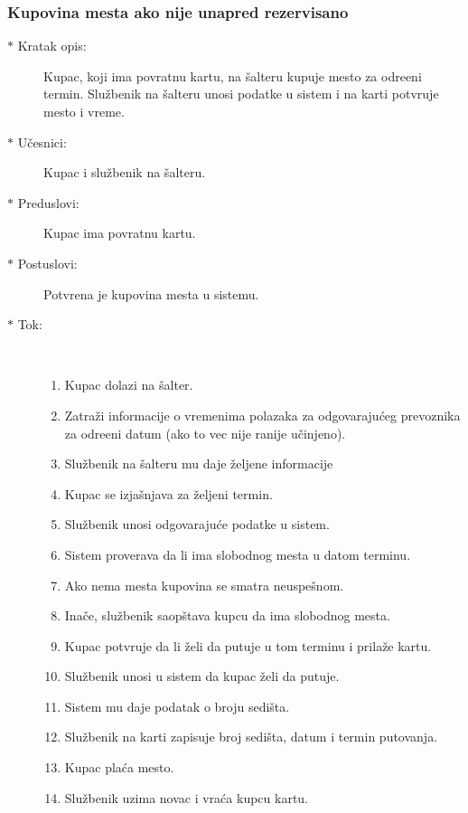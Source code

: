 \subsubsection{Kupovina mesta ako nije unapred rezervisano}
\begin{description}
	\item[$\ast$ Kratak opis: ] Kupac, koji ima povratnu kartu, na \v salteru kupuje mesto za odre\dj{}eni termin. Slu\v zbenik na \v salteru unosi podatke u sistem i na karti potvr\dj{}uje mesto i vreme.
	\item[$\ast$ U\v cesnici: ] Kupac i slu\v zbenik na \v salteru.
	\item[$\ast$ Preduslovi: ] Kupac ima povratnu kartu.
	\item[$\ast$ Postuslovi: ] Potvr\dj{}ena je kupovina mesta u sistemu.
	\item[$\ast$ Tok: ] \ \\
	\begin{enumerate}
		\item Kupac dolazi na \v salter.
		\item Zatra\v zi informacije o vremenima polazaka za odgovaraju\'ceg prevoznika za odre\dj{}eni datum (ako to vec nije ranije u\v cinjeno).
		\item Slu\v zbenik na \v salteru mu daje \v zeljene informacije
		\item Kupac se izja\v snjava za \v zeljeni termin.
		\item Slu\v zbenik unosi odgovaraju\'ce podatke u sistem.
		\item Sistem proverava da li ima slobodnog mesta u datom terminu.
		\item Ako nema mesta kupovina se smatra neuspe\v snom.
		\item Ina\v ce, slu\v zbenik saop\v stava kupcu da ima slobodnog mesta.
		\item Kupac potvr\dj{}uje da li \v zeli da putuje u tom terminu i prila\v ze kartu.
		\item Slu\v zbenik unosi u sistem da kupac \v zeli da putuje.
		\item Sistem mu daje podatak o broju sedi\v sta.
		\item Slu\v zbenik na karti zapisuje broj sedi\v sta, datum i termin putovanja.
		\item Kupac pla\'ca mesto.
		\item Slu\v zbenik uzima novac i vra\'ca kupcu kartu.
	\end{enumerate}
\end{description}

